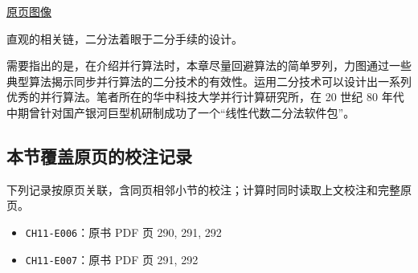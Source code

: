 \documentclass[
  10pt,
  fontset=fandol]{ctexart}
\providecommand{\tightlist}{%
  \setlength{\itemsep}{0pt}\setlength{\parskip}{0pt}}
\begin{document}
\href{../../source-images/pdf-293.jpeg}{原页图像}

直观的相关链，二分法着眼于二分手续的设计。

需要指出的是，在介绍并行算法时，本章尽量回避算法的简单罗列，力图通过一些典型算法揭示同步并行算法的二分技术的有效性。运用二分技术可以设计出一系列优秀的并行算法。笔者所在的华中科技大学并行计算研究所，在 20 世纪 80 年代中期曾针对国产银河巨型机研制成功了一个``线性代数二分法软件包''。

\subsection{本节覆盖原页的校注记录}\label{ux672cux8282ux8986ux76d6ux539fux9875ux7684ux6821ux6ce8ux8bb0ux5f55}

下列记录按原页关联，含同页相邻小节的校注；计算时同时读取上文校注和完整原页。

\begin{itemize}
\tightlist
\item
  \texttt{CH11-E006}：原书 PDF 页 290, 291, 292
\item
  \texttt{CH11-E007}：原书 PDF 页 291, 292
\end{itemize}
\end{document}
